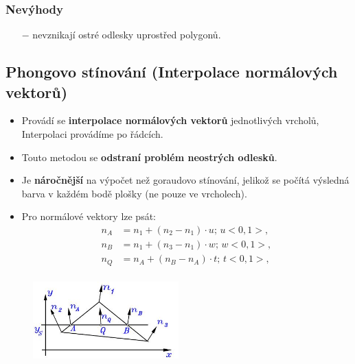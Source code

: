 		\subsubsection*{Nevýhody}
			\begin{itemize}
				\item[$-$] nevznikají ostré odlesky uprostřed polygonů.
			\end{itemize}
\subsection{Phongovo stínování (Interpolace normálových vektorů)}
\begin{itemize}
	\item Provádí se \textbf{interpolace normálových vektorů} jednotlivých vrcholů, Interpolaci provádíme po řádcích.
	\item Touto metodou se \textbf{odstraní problém neostrých odlesků}.
	\item Je \textbf{náročnější} na výpočet než goraudovo stínování, jelikož se počítá výsledná barva v každém bodě plošky (ne pouze ve vrcholech).
	\item Pro normálové vektory lze psát:
		\begin{equation*} 
		\begin{split}
			n_A &= n_1 + (n_2 - n_1) \cdot u; \, u <0, 1>, \\
			n_B &= n_1 + (n_3 - n_1) \cdot w; \, w <0, 1>, \\
			n_Q &= n_A + (n_B - n_A) \cdot t; \, t <0, 1>, \\
		\end{split}
		\end{equation*}
\end{itemize}
		\begin{figure}[H]
		\centering
		\includegraphics[width=0.5\textwidth]{assets/5_phong_stin}
		\end{figure}
